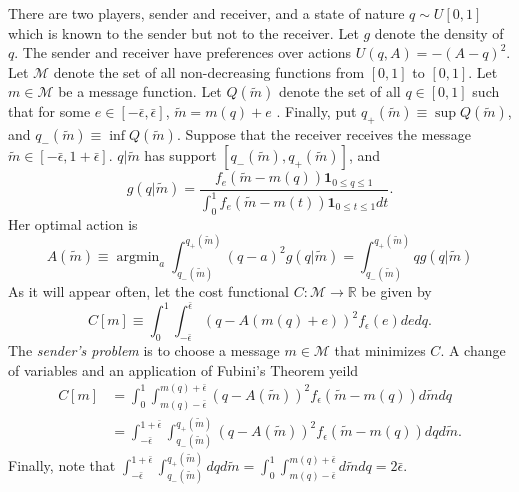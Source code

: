 \documentclass[12pt]{article}
\DeclareMathOperator*{\argmin}{\text{argmin}}
\begin{document}
\onehalfspacing
There are two players, sender and receiver, and a state of nature $q\sim U[0,1]$ which is known to the sender but not to the receiver. Let $g$ denote the density of $q$. The sender and receiver have preferences over actions $U(q,A)=-(A-q)^{2}$. Let $\mathcal{M}$ denote the set of all non-decreasing functions from $[0,1]$ to $[0,1]$. Let $m\in\mathcal{M}$ be a message function. Let $Q(\widetilde{m})$ denote the set of all $q\in[0,1]$ such that for some $e\in[-\bar{\epsilon},\bar{\epsilon}]$, $\widetilde{m}=m(q)+e$ . Finally, put $q_{+}(\widetilde{m})\equiv\sup Q(\widetilde{m})$, and $q_{-}(\widetilde{m})\equiv\inf Q(\widetilde{m})$. Suppose that the receiver receives the message $\widetilde{m}\in[-\bar{\epsilon},1+\bar{\epsilon}]$. $q|\widetilde{m}$ has support $[q_{-}(\widetilde{m}),q_{+}(\widetilde{m})]$, and 
\begin{equation}
g(q|\widetilde{m})=\frac{f_{e}(\widetilde{m}-m(q))\mathbf{1}_{0\leq q\leq 1}}{\int_{0}^{1}{f_{e}(\widetilde{m}-m(t))\mathbf{1}_{0\leq t\leq 1}dt}}.
\end{equation}
Her optimal action is 
\begin{equation}
A(\widetilde{m})\equiv\argmin_{a}\int_{q_{-}(\widetilde{m})}^{q_{+}(\widetilde{m})}{(q-a)^{2}g(q|\widetilde{m})}=\int_{q_{-}(\widetilde{m})}^{q_{+}(\widetilde{m})}{qg(q|\widetilde{m})}
\end{equation}
\noindent As it will appear often, let the cost functional $C:\mathcal{M}\rightarrow\mathbb{R}$ be given by
\begin{equation}\label{eq:costfunctional}
C[m]\equiv\int_{0}^{1}{\int_{-\bar{\epsilon}}^{\bar{\epsilon}}{(q-A(m(q)+e))^{2}f_{\epsilon}(e)de}dq}.
\end{equation}
The \textit{sender's problem} is to choose a message $m\in\mathcal{M}$ that minimizes $C$. A change of variables and an application of Fubini's Theorem yeild
\begin{align}
C[m]&=\int_{0}^{1}{\int_{m(q)-\bar{\epsilon}}^{m(q)+\bar{\epsilon}}{(q-A(\widetilde{m}))^{2}f_{\epsilon}(\widetilde{m}-m(q))d\widetilde{m}}dq}\\
&=\int_{-\bar{\epsilon}}^{1+\bar{\epsilon}}{\int_{q_{-}(\widetilde{m})}^{q_{+}(\widetilde{m})}{(q-A(\widetilde{m}))^{2}f_{\epsilon}(\widetilde{m}-m(q))dq}d\widetilde{m}}.
\end{align}
Finally, note that $\int_{-\bar{\epsilon}}^{1+\bar{\epsilon}}{\int_{q_{-}(\widetilde{m})}^{q_{+}(\widetilde{m})}{dq}d\widetilde{m}}=\int_{0}^{1}{\int_{m(q)-\bar{\epsilon}}^{m(q)+\bar{\epsilon}}{d\widetilde{m}}dq}=2\bar{\epsilon}$.
\end{document}
